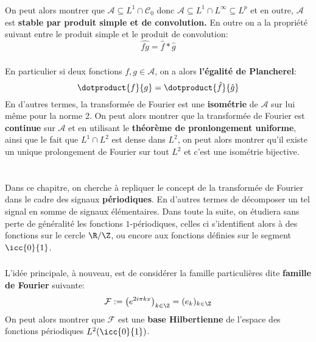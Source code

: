 \subsection*{}
On peut alors montrer que \( \mathscr{A} \subseteq L^1 \cap \mathcal{C}_0 \) donc \( \mathscr{A} \subseteq L^1 \cap L^\infty \subseteq L^p \) et en outre, \( \mathscr{A} \) est \textbf{stable par produit simple et de convolution.} En outre on a la propriété suivant entre le produit simple et le produit de convolution:
\[ 
   \hat{fg} = \hat{f}*\hat{g} 
\]

\subsection*{}
En particulier si deux fonctions \( f, g \in \mathscr{A} \), on a alors \textbf{l'égalité de Plancherel}:
\[ 
   \dotproduct{f}{g} =  \dotproduct{\hat{f}}{\hat{g}}
\]
En d'autres termes, la transformée de Fourier est une \textbf{isométrie} de \( \mathscr{A} \) sur lui même pour la norme 2. On peut alors montrer que la transformée de Fourier est \textbf{continue} sur \( \mathscr{A} \) et en utilisant le \textbf{théorème de pronlongement uniforme}, ainsi que le fait que \( L^1 \cap L^2 \) est dense dans \( L^2 \), on peut alors montrer qu'il existe un unique prolongement de Fourier sur tout \( L^2 \) et c'est une isométrie bijective.
\chapter*{} %
Dans ce chapitre, on cherche à repliquer le concept de la transformée de Fourier dans le cadre des signaux \textbf{périodiques}. En d'autres termes de décomposer un tel signal en somme de signaux élémentaires. Dans toute la suite, on étudiera sans perte de généralité les fonctions \( 1 \)-périodiques, celles ci s'identifient alors à des fonctions sur le cercle \( \R/\Z \), ou encore aux fonctions définies sur le segment \( \icc{0}{1} \).

\subsection*{}
L'idée principale, à nouveau, est de considérer la famille particulières dite \textbf{famille de Fourier} suivante:
\[ 
   \mathcal{F} := \left(e^{2i\pi kx}\right)_{k \in \Z} = (e_k)_{k \in \Z}
\]
On peut alors montrer que \( \mathcal{F} \) est une \textbf{base Hilbertienne} de l'espace des fonctions périodiques \( L^2(\icc{0}{1})\).
